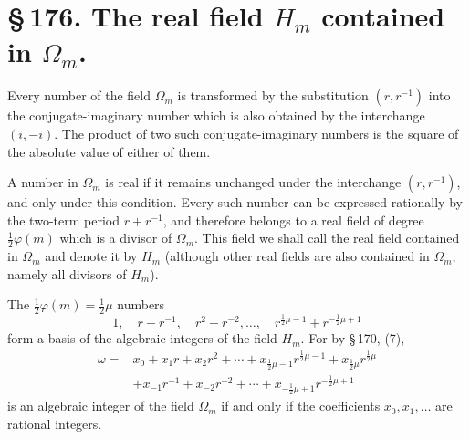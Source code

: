 \documentclass[11pt]{article}
\begin{document}
\section*{\S\,176. The real field $H_m$ contained in $\Omega_m$.}

Every number of the field $\Omega_m$ is transformed by the substitution $(r,r^{-1})$ into the conjugate-imaginary number which is also obtained by the interchange $(i,-i)$. The product of two such conjugate-imaginary numbers is the square of the absolute value of either of them.

A number in $\Omega_m$ is real if it remains unchanged under the interchange $(r,r^{-1})$, and only under this condition. Every such number can be expressed rationally by the two-term period $r+r^{-1}$, and therefore belongs to a real field of degree $\frac12\varphi(m)$ which is a divisor of $\Omega_m$. This field we shall call the real field contained in $\Omega_m$ and denote it by $H_m$ (although other real fields are also contained in $\Omega_m$, namely all divisors of $H_m$).

The $\frac12\varphi(m)=\frac12\mu$ numbers
\begin{equation}
1,\quad r+r^{-1},\quad r^2+r^{-2},\ldots,\quad r^{\frac12\mu-1}+r^{-\frac12\mu+1}
\tag{1}
\end{equation}
form a basis of the algebraic integers of the field $H_m$. For by \S\,170, (7),
\begin{equation}
\begin{aligned}
\omega={}&x_0+x_1r+x_2r^2+\cdots+x_{\frac12\mu-1}r^{\frac12\mu-1}+x_{\frac12\mu}r^{\frac12\mu} \\
&+x_{-1}r^{-1}+x_{-2}r^{-2}+\cdots+x_{-\frac12\mu+1}r^{-\frac12\mu+1}
\end{aligned}
\tag{2}
\end{equation}
is an algebraic integer of the field $\Omega_m$ if and only if the coefficients $x_0,x_1,
\ldots$ are rational integers.
\end{document}
